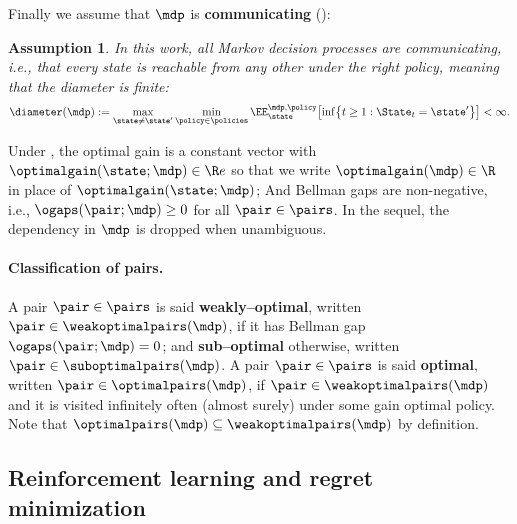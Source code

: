 \documentclass[preprint,cleveref,12pt]{colt2025}
\newtheorem{assumption}{Assumption}
\DeclarePairedDelimiter{\braces}{\{}{\}}	%
\DeclarePairedDelimiter{\brackets}{[}{]}	%
\def\model{\mdp}
\def\optpairs{\optimalpairs}
\def\wkoptpairs{\weakoptimalpairs}
\def\optgain{\optimalgain} %
\newcommand{\strong}[1]{\textbf{#1}}
\begin{document}
   Finally we assume that $\model$ is \strong{communicating} ():

    \begin{assumption}
    \label{assumption_communicating}
        In this work, all Markov decision processes are {communicating}, i.e., that every state is reachable from any other under the right policy, meaning that the {diameter} is finite:
        \begin{equation}
        \label{equation_diameter}
            \diameter(\model)
            :=
            \max_{\state \ne \state'}
            \min_{\policy \in \policies}
            \EE_{\state}^{\model, \policy}
            \brackets*{
                \inf \braces*{
                    t \ge 1
                    :
                    \State_t = \state'
                }
            }
            <
            \infty
            .
        \end{equation}
    \end{assumption}

    Under , the optimal gain is a constant vector with $\optgain(\state; \model) \in \R e$ so that we write $\optgain(\model) \in \R$ in place of $\optgain(\state; \model)$; And Bellman gaps are non-negative, i.e., $\ogaps(\pair; \model) \ge 0$ for all $\pair \in \pairs$. 
    In the sequel, the dependency in $\model$ is dropped when unambiguous.

    \paragraph{Classification of pairs.}
    A pair $\pair \in \pairs$ is said \strong{weakly--optimal}, written $\pair \in \wkoptpairs(\model)$, if it has Bellman gap $\ogaps(\pair; \model) = 0$; and \strong{sub--optimal} otherwise, written $\pair \in \suboptimalpairs(\model)$. 
    A pair $\pair \in \pairs$ is said \strong{optimal}, written $\pair \in \optpairs(\model)$, if $\pair \in \wkoptpairs(\model)$ and it is visited infinitely often (almost surely) under some gain optimal policy.
    Note that $\optpairs(\model) \subseteq \wkoptpairs(\model)$ by definition.

    \subsection{Reinforcement learning and regret minimization}
\end{document}
